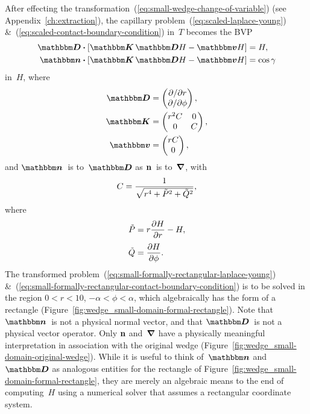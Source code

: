 After effecting the transformation~(\ref{eq:small-wedge-change-of-variable})
(see Appendix~\ref{ch:extraction}),
the capillary problem~(\ref{eq:scaled-laplace-young})
\&~(\ref{eq:scaled-contact-boundary-condition}) in~$T$
becomes the BVP
\begin{align}
  \matder \dotp \squarebr[\bulkysize]{\mat{K} \matder H - \mat{v} H}
    &= H,
    \label{eq:small-formally-rectangular-laplace-young} \\
  \mat{n} \dotp \squarebr[\bulkysize]{\mat{K} \matder H - \mat{v} H}
    &= \cos\gamma
    \label{eq:small-formally-rectangular-contact-boundary-condition}
\end{align}
in~$H$, where
\begin{align}
  \matder &=
    \begin{pmatrix}
      \pd / {\pd r} \\
      \pd / {\pd\phi}
    \end{pmatrix},
    \label{eq:small-formally-rectangular-derivative} \\
  \mat{K} &=
    \begin{pmatrix}
      r^2 C & 0 \\
      0 & C
    \end{pmatrix},
    \label{eq:small-formally-rectangular-diffusion-coefficient} \\
  \mat{v} &=
    \begin{pmatrix}
      r C \\
      0
    \end{pmatrix},
    \label{eq:small-formally-rectangular-convection-coefficient}
\end{align}
and $\mat{n}$~is to~$\matder$ as $\mathop{}\!\boldsymbol{\mathbf{n}}$~is to~$\mathop{}\!\boldsymbol{\mathbf{\nabla}}$,
with
\begin{equation}
  \savecontent{
    C = \frac{1}{\sqrt{r^4 + \desing{P}^2 + \desing{Q}^2}}
  }{eq:small-formally-rectangular-scalar-coefficient},
\end{equation}
where
\begin{align}
  \desing{P} &= r \pder{H}{r} - H,
    \label{eq:small-gradient-de-singularised-r-component}
    \\[\tallspace]
  \desing{Q} &= \pder{H}{\phi}.
    \label{eq:small-gradient-de-singularised-phi-component}
\end{align}
The transformed problem~(\ref{eq:small-formally-rectangular-laplace-young})
\&~(\ref{eq:small-formally-rectangular-contact-boundary-condition})
is to be solved in the region
$0 < r < 10$, $-\alpha < \phi < \alpha$,
which algebraically has the form of a rectangle
(Figure~\ref{fig:wedge_small-domain-formal-rectangle}).
Note that $\mat{n}$~is not a physical normal vector,
and that $\matder$~is not a physical vector operator.
Only $\mathop{}\!\boldsymbol{\mathbf{n}}$ and~$\mathop{}\!\boldsymbol{\mathbf{\nabla}}$ have a physically meaningful interpretation
in association with the original wedge
(Figure~\ref{fig:wedge_small-domain-original-wedge}).
While it is useful to think of~$\mat{n}$ and~$\matder$
as analogous entities for the rectangle of
Figure~\ref{fig:wedge_small-domain-formal-rectangle},
they are merely an algebraic means to the end of computing~$H$
using a numerical solver that assumes a rectangular coordinate system.

